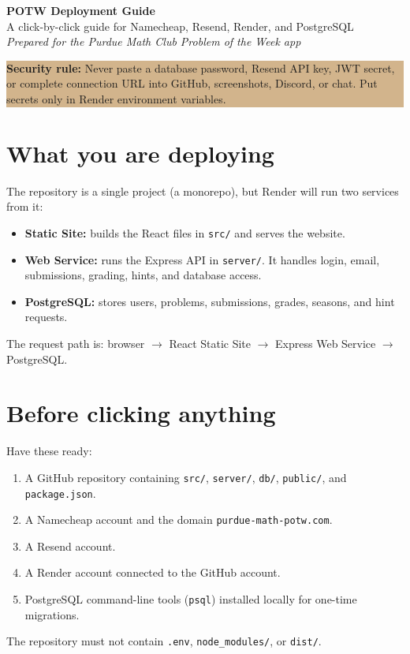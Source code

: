 \documentclass[11pt]{article}
\newcommand{\code}[1]{\texttt{\small #1}}
\begin{document}
\begin{center}
 {\Huge\bfseries POTW Deployment Guide}\\[6pt]
 {\large A click-by-click guide for Namecheap, Resend, Render, and PostgreSQL}\\[10pt]
 \textit{Prepared for the Purdue Math Club Problem of the Week app}
\end{center}

\begin{center}\colorbox{tan}{\parbox{0.92\linewidth}{\textbf{Security rule:} Never paste a database password, Resend API key, JWT secret, or complete connection URL into GitHub, screenshots, Discord, or chat. Put secrets only in Render environment variables.}}\end{center}

\tableofcontents
\newpage

\section{What you are deploying}
The repository is a single project (a monorepo), but Render will run two services from it:
\begin{itemize}
 \item \textbf{Static Site:} builds the React files in \code{src/} and serves the website.
 \item \textbf{Web Service:} runs the Express API in \code{server/}. It handles login, email, submissions, grading, hints, and database access.
 \item \textbf{PostgreSQL:} stores users, problems, submissions, grades, seasons, and hint requests.
\end{itemize}
The request path is: browser $\rightarrow$ React Static Site $\rightarrow$ Express Web Service $\rightarrow$ PostgreSQL.

\section{Before clicking anything}
Have these ready:
\begin{enumerate}
 \item A GitHub repository containing \code{src/}, \code{server/}, \code{db/}, \code{public/}, and \code{package.json}.
 \item A Namecheap account and the domain \code{purdue-math-potw.com}.
 \item A Resend account.
 \item A Render account connected to the GitHub account.
 \item PostgreSQL command-line tools (\code{psql}) installed locally for one-time migrations.
\end{enumerate}
The repository must not contain \code{.env}, \code{node\_modules/}, or \code{dist/}.
\end{document}
